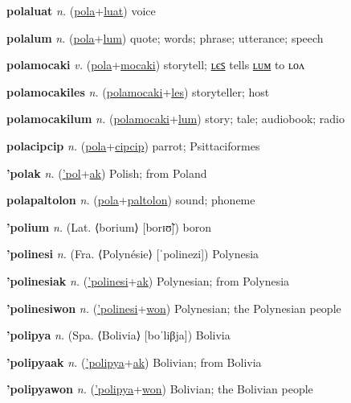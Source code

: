 \textbf{\hypertarget{polaluat}{polaluat}} \textit{n.} (\hyperlink{pola}{pola}+\allowbreak \hyperlink{luat}{luat})
voice

\textbf{\hypertarget{polalum}{polalum}} \textit{n.} (\hyperlink{pola}{pola}+\allowbreak \hyperlink{lum}{lum})
quote; words; phrase; utterance; speech

\textbf{\hypertarget{polamocaki}{polamocaki}} \textit{v.} (\hyperlink{pola}{pola}+\allowbreak \hyperlink{mocaki}{mocaki})
storytell; \hyperlink{polamocakiles}{ʟєꜱ} tells \hyperlink{polamocakilum}{ʟᴜᴍ} to ʟᴏᴧ

\textbf{\hypertarget{polamocakiles}{polamocakiles}} \textit{n.} (\hyperlink{polamocaki}{polamocaki}+\allowbreak \hyperlink{les}{les})
storyteller; host

\textbf{\hypertarget{polamocakilum}{polamocakilum}} \textit{n.} (\hyperlink{polamocaki}{polamocaki}+\allowbreak \hyperlink{lum}{lum})
story; tale; audiobook; radio

\textbf{\hypertarget{polacipcip}{polacipcip}} \textit{n.} (\hyperlink{pola}{pola}+\allowbreak \hyperlink{cipcip}{cipcip})
parrot; Psittaciformes

\textbf{\hypertarget{'polak}{'polak}} \textit{n.} (\hyperlink{'pol}{'pol}+\allowbreak \hyperlink{ak}{ak})
Polish; from Poland

\textbf{\hypertarget{polapaltolon}{polapaltolon}} \textit{n.} (\hyperlink{pola}{pola}+\allowbreak \hyperlink{paltolon}{paltolon})
sound; phoneme

\textbf{\hypertarget{'polium}{'polium}} \textit{n.} (Lat. ⟨borium⟩ [borɪʊ̃])
boron

\textbf{\hypertarget{'polinesi}{'polinesi}} \textit{n.} (Fra. ⟨Polynésie⟩ [ˈpolinezi])
Polynesia

\textbf{\hypertarget{'polinesiak}{'polinesiak}} \textit{n.} (\hyperlink{'polinesi}{'polinesi}+\allowbreak \hyperlink{ak}{ak})
Polynesian; from Polynesia

\textbf{\hypertarget{'polinesiwon}{'polinesiwon}} \textit{n.} (\hyperlink{'polinesi}{'polinesi}+\allowbreak \hyperlink{won}{won})
Polynesian; the Polynesian people

\textbf{\hypertarget{'polipya}{'polipya}} \textit{n.} (Spa. ⟨Bolivia⟩ [boˈliβja])
Bolivia

\textbf{\hypertarget{'polipyaak}{'polipyaak}} \textit{n.} (\hyperlink{'polipya}{'polipya}+\allowbreak \hyperlink{ak}{ak})
Bolivian; from Bolivia

\textbf{\hypertarget{'polipyawon}{'polipyawon}} \textit{n.} (\hyperlink{'polipya}{'polipya}+\allowbreak \hyperlink{won}{won})
Bolivian; the Bolivian people

